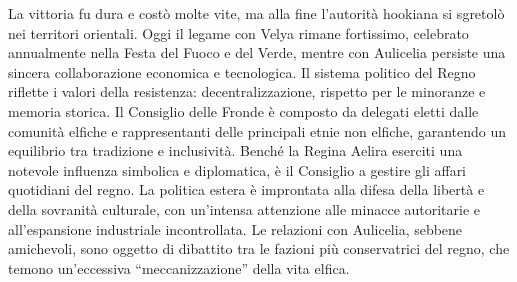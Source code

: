 \documentclass[10pt, a4paper]{report}
\begin{document}
\begin{multicols}{2}
La vittoria fu dura e costò molte vite, ma alla fine l’autorità hookiana si sgretolò nei territori orientali.
Oggi il legame con Velya rimane fortissimo, celebrato annualmente nella Festa del Fuoco e del Verde, mentre con Aulicelia persiste una sincera collaborazione economica e tecnologica.
Il sistema politico del Regno riflette i valori della resistenza: decentralizzazione, rispetto per le minoranze e memoria storica. Il Consiglio delle Fronde è composto da delegati eletti dalle comunità elfiche e rappresentanti delle principali etnie non elfiche, garantendo un equilibrio tra tradizione e inclusività. Benché la Regina Aelira eserciti una notevole influenza simbolica e diplomatica, è il Consiglio a gestire gli affari quotidiani del regno. La politica estera è improntata alla difesa della libertà e della sovranità culturale, con un’intensa attenzione alle minacce autoritarie e all’espansione industriale incontrollata. Le relazioni con Aulicelia, sebbene amichevoli, sono oggetto di dibattito tra le fazioni più conservatrici del regno, che temono un’eccessiva “meccanizzazione” della vita elfica.


\end{multicols}
\end{document}
